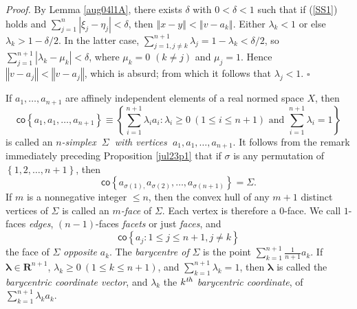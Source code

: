 \documentclass[11pt]{article}%
\newenvironment{proof}[1][Proof]{\noindent\textit{#1.} }{}
\begin{document}
\begin{proof}
By Lemma \ref{aug04l1A}, there exists $\delta$ with $0<\delta<1$ such that if
(\ref{SS1}) holds and $\sum_{j=1}^{n}\left\vert \xi_{j}-\eta_{j}\right\vert
<\delta$, then $\left\Vert x-y\right\Vert <\left\Vert v-a_{k}\right\Vert $.
Either $\lambda_{k}<1$ or else $\lambda_{k}>1-\delta/2$. In the latter case,
$\sum_{j=1,j\neq k}^{n+1}\lambda_{j}=1-\lambda_{k}<\delta/2$, so $\sum
_{j=1}^{n+1}\left\vert \lambda_{k}-\mu_{k}\right\vert <\delta$, where $\mu
_{k}=0$ $\left(  k\neq j\right)  $ and $\mu_{j}=1$. Hence $\left\Vert
v-a_{j}\right\Vert <\left\Vert v-a_{j}\right\Vert $, which is absurd; from
which it follows that $\lambda_{j}<1$.%
\hfill
$\square$
\end{proof}

%

\smallskip
If $a_{1},\ldots,a_{n+1}$ are affinely independent elements of a real normed
space $X$, then%
\[
\mathsf{co}\left\{  a_{1},a_{1},\ldots,a_{n+1}\right\}  \equiv\left\{
{\textstyle\sum_{i=1}^{n+1}}
\lambda_{i}a_{i}:\lambda_{i}\geq0\ (1\leq i\leq n+1)\text{ and }%
{\textstyle\sum_{i=1}^{n+1}}
\lambda_{i}=1\right\}
\]
is called an $n$\emph{-simplex}\textbf{\ }$\Sigma$\textbf{\ }\emph{with
vertices}\textbf{\ }$a_{1},a_{1},\ldots,a_{n+1}$. It follows from the remark
immediately preceding Proposition \ref{jul23p1} that if $\sigma$ is any
permutation of $\left\{  1,2,\ldots,n+1\right\}  $, then
\[
\mathsf{co}\left\{  a_{\sigma(1),}a_{\sigma(2)},\ldots,a_{\sigma
(n+1)}\right\}  =\Sigma\text{.}%
\]
If $m$ is a nonnegative integer $\leq n$, then the convex hull of any $m+1$
distinct vertices of $\Sigma$ is called an $m$\emph{-face} of $\Sigma$. Each
vertex is therefore a $0$-face. We call $1$-faces \emph{edges}, $\left(
n-1\right)  $-faces \emph{facets} or just \emph{faces}, and%
\[
\mathsf{co}\left\{  a_{j}:1\leq j\leq n+1,j\neq k\right\}
\]
the face of $\Sigma$ \emph{opposite }$a_{k}$. The \emph{barycentre of }%
$\Sigma$ is the point $\sum_{k=1}^{n+1}\frac{1}{n+1}a_{k}$. If
$\mathbf{\lambda}\in\mathbf{R}^{n+1}$, $\lambda_{k}\geq0\ \left(  1\leq k\leq
n+1\right)  $, and $\sum_{k=1}^{n+1}\lambda_{k}=1$, then $\mathbf{\lambda}$ is
called the \emph{barycentric coordinate vector}, and $\lambda_{k}$ the
$k^{\text{\emph{th}}}$ \emph{barycentric coordinate}, of $%
{\textstyle\sum_{k=1}^{n+1}}
\lambda_{k}a_{k}$.
\end{document}
